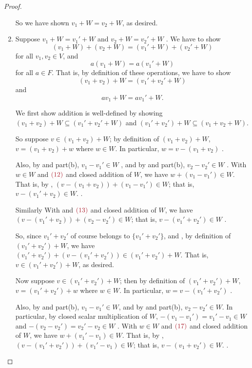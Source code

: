 \begin{proof}
\begin{enumerate}
So we have shown \(v_1 + W = v_2 + W\), as desired.

\item
Suppose \(v_1 + W = v_1' + W\)  and \(v_2 + W = v_2' + W\) .
We have to show
\[
    (v_1 + W) + (v_2 + W) = (v_1' + W) + (v_2' + W)
\]
for all \(v_1, v_2 \in V\), and
\[
    a(v_1 + W) = a(v_1' + W)
\]
for all \(a \in F\).
That is, by definition of these operations, we have to show
\[
    (v_1 + v_2) + W = (v_1' + v_2' + W)
\]
and
\[
    av_1 + W = av_1' + W.
\]

We first show addition is well-defined by showing \((v_1 + v_2) + W \subseteq (v_1' + v_2' + W)\) and \((v_1' + v_2') + W \subseteq (v_1 + v_2 + W)\).

So suppose \(v \in (v_1 + v_2) + W\);
by definition of \((v_1 + v_2) + W\), \(v = (v_1 + v_2) + w\) where \(w \in W\).
In particular, \(w = v - (v_1 + v_2)\) .

Also, by  and part(b), \(v_1 - v_1' \in W\) , and by  and part(b), \(v_2 - v_2' \in W\) .
With \(w \in W\) and \(\MAROON{(12)}\) and closed addition of \(W\), we have \(w + (v_1 - v_1') \in W\).
That is, by , \((v - (v_1 + v_2)) + (v_1 - v_1') \in W\);
that is, \(v - (v_1' + v_2) \in W\). .

Similarly With  and \(\MAROON{(13)}\) and closed addition of \(W\), we have \((v - (v_1' + v_2)) + (v_2 - v_2') \in W\);
that is, \(v - (v_1' + v_2') \in W\) .

So, since \(v_1' + v_2'\) of course belongs to \(\{ v_1' + v_2' \}\), and , by definition of \((v_1' + v_2') + W\), we have \((v_1' + v_2') + (v - (v_1' + v_2')) \in (v_1' + v_2') + W\).
That is, \(v \in (v_1' + v_2') + W\), as desired.

Now suppose \(v \in (v_1' + v_2') + W\);
then by definition of \((v_1' + v_2') + W\), \(v = (v_1' + v_2') + w\) where \(w \in W\).
In particular, \(w = v - (v_1' + v_2')\) .

Also, by  and part(b), \(v_1 - v_1' \in W\), and by  and part(b), \(v_2 - v_2' \in W\).
In particular, by closed scalar multiplication of \(W\), \(-(v_1 - v_1') = v_1' - v_1 \in W\)  and \(-(v_2 - v_2') = v_2' - v_2 \in W\) .
With \(w \in W\) and \(\MAROON{(17)}\) and closed addition of \(W\), we have \(w + (v_1' - v_1) \in W\).
That is, by , \((v - (v_1' + v_2')) + (v_1' - v_1) \in W\);
that is, \(v - (v_1 + v_2') \in W\). .


\end{enumerate}
\end{proof}
